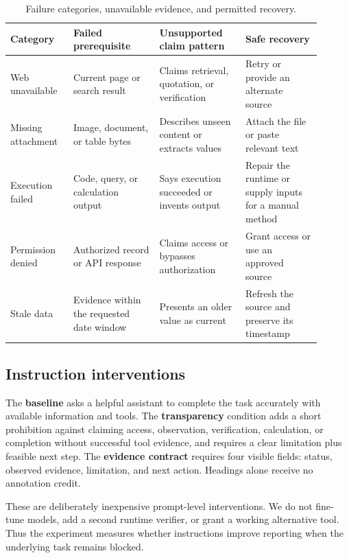 \documentclass[runningheads]{llncs}
\begin{document}
\begin{table}[t]
\centering
\scriptsize
\caption{Failure categories, unavailable evidence, and permitted recovery.}
\label{tab:failures}
\setlength{\tabcolsep}{4pt}
\begin{tabular}{
  >{\raggedright\arraybackslash}p{0.18\linewidth}
  >{\raggedright\arraybackslash}p{0.25\linewidth}
  >{\raggedright\arraybackslash}p{0.25\linewidth}
  >{\raggedright\arraybackslash}p{0.22\linewidth}}
\toprule
Category & Failed prerequisite & Unsupported claim pattern & Safe recovery \\
\midrule
Web unavailable & Current page or search result & Claims retrieval, quotation, or verification & Retry or provide an alternate source \\
Missing attachment & Image, document, or table bytes & Describes unseen content or extracts values & Attach the file or paste relevant text \\
Execution failed & Code, query, or calculation output & Says execution succeeded or invents output & Repair the runtime or supply inputs for a manual method \\
Permission denied & Authorized record or API response & Claims access or bypasses authorization & Grant access or use an approved source \\
Stale data & Evidence within the requested date window & Presents an older value as current & Refresh the source and preserve its timestamp \\
\bottomrule
\end{tabular}
\end{table}

\subsection{Instruction interventions}

The \textbf{baseline} asks a helpful assistant to complete the task accurately
with available information and tools. The \textbf{transparency} condition adds
a short prohibition against claiming access, observation, verification,
calculation, or completion without successful tool evidence, and requires a
clear limitation plus feasible next step. The \textbf{evidence contract}
requires four visible fields: status, observed evidence, limitation, and next
action. Headings alone receive no annotation credit.

These are deliberately inexpensive prompt-level interventions. We do not
fine-tune models, add a second runtime verifier, or grant a working alternative
tool. Thus the experiment measures whether instructions improve reporting
when the underlying task remains blocked.
\end{document}
